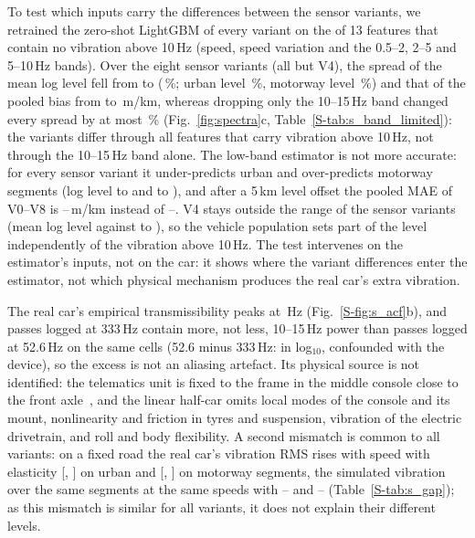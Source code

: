 To test which inputs carry the differences between the sensor variants, we retrained the zero-shot LightGBM of every variant on the \blNfeatLow{} of 13 features that contain no vibration above 10\,Hz (speed, speed variation and the 0.5--2, 2--5 and 5--10\,Hz bands).
Over the eight sensor variants (all but V4), the spread of the mean log level fell from \blFullSpreadLvl{} to \blLowSpreadLvl{} (\blRatioLvl\,\%; urban level \blRatioLvlUrban\,\%, motorway level \blRatioLvlMotorway\,\%) and that of the pooled bias from \blFullSpreadBias{} to \blLowSpreadBias\,m/km, whereas dropping only the 10--15\,Hz band changed every spread by at most \blNoHighMaxChange\,\% (Fig.~\ref{fig:spectra}c, Table~\ref{S-tab:s_band_limited}): the variants differ through all features that carry vibration above 10\,Hz, not through the 10--15\,Hz band alone.
The low-band estimator is not more accurate: for every sensor variant it under-predicts urban and over-predicts motorway segments (log level \blLowLvlUrbanMin{} to \blLowLvlUrbanMax{} and \blLowLvlMotorwayMin{} to \blLowLvlMotorwayMax), and after a 5\,km level offset the pooled MAE of V0--V8 is \blLowCalMin--\blLowCalMax\,m/km instead of \blFullCalMin--\blFullCalMax.
V4 stays outside the range of the sensor variants (mean log level \blLowVfourLvl{} against \blLowLvlMin{} to \blLowLvlMax), so the vehicle population sets part of the level independently of the vibration above 10\,Hz.
The test intervenes on the estimator's inputs, not on the car: it shows where the variant differences enter the estimator, not which physical mechanism produces the real car's extra vibration.

The real car's empirical transmissibility peaks at \invPeakHz\,Hz (Fig.~\ref{S-fig:s_acf}b), and passes logged at 333\,Hz contain more, not less, 10--15\,Hz power than passes logged at 52.6\,Hz on the same cells (52.6 minus 333\,Hz: \spAliasHigh{} in log$_{10}$, confounded with the device), so the excess is not an aliasing artefact.
Its physical source is not identified: the telematics unit is fixed to the frame in the middle console close to the front axle~\cite{skar2023lira}, and the linear half-car omits local modes of the console and its mount, nonlinearity and friction in tyres and suspension, vibration of the electric drivetrain, and roll and body flexibility.
A second mismatch is common to all variants: on a fixed road the real car's vibration RMS rises with speed with elasticity \ssRealUrban{} [\ssRealUrbanLo, \ssRealUrbanHi] on urban and \ssRealMotorway{} [\ssRealMotorwayLo, \ssRealMotorwayHi] on motorway segments, the simulated vibration over the same segments at the same speeds with \ssSimUrbanMin--\ssSimUrbanMax{} and \ssSimMotorwayMin--\ssSimMotorwayMax{} (Table~\ref{S-tab:s_gap}); as this mismatch is similar for all variants, it does not explain their different levels.

